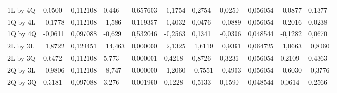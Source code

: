 \begin{table}[H]
{\begin{tabular}{lllllllllll}
\rowcolor[HTML]{FFFFFF} 
1L by 4Q       & 0,0500                          & 0,112108                        & 0,446                           & 0,657603                        & -0,1754                         & 0,2754                          & 0,0250                          & 0,056054                        & -0,0877                         & 0,1377                          \\
\rowcolor[HTML]{FFFFFF} 
1Q by 4L       & -0,1778                         & 0,112108                        & -1,586                          & 0,119357                        & -0,4032                         & 0,0476                          & -0,0889                         & 0,056054                        & -0,2016                         & 0,0238                          \\
\rowcolor[HTML]{FFFFFF} 
1Q by 4Q       & -0,0611                         & 0,097088                        & -0,629                          & 0,532046                        & -0,2563                         & 0,1341                          & -0,0306                         & 0,048544                        & -0,1282                         & 0,0670                          \\
\rowcolor[HTML]{FFFFFF} 
2L by 3L       & {\color[HTML]{FF0000} -1,8722}  & {\color[HTML]{FF0000} 0,129451} & {\color[HTML]{FF0000} -14,463}  & {\color[HTML]{FF0000} 0,000000} & {\color[HTML]{FF0000} -2,1325}  & {\color[HTML]{FF0000} -1,6119}  & {\color[HTML]{FF0000} -0,9361}  & {\color[HTML]{FF0000} 0,064725} & {\color[HTML]{FF0000} -1,0663}  & {\color[HTML]{FF0000} -0,8060}  \\
\rowcolor[HTML]{FFFFFF} 
2L by 3Q       & {\color[HTML]{FF0000} 0,6472}   & {\color[HTML]{FF0000} 0,112108} & {\color[HTML]{FF0000} 5,773}    & {\color[HTML]{FF0000} 0,000001} & {\color[HTML]{FF0000} 0,4218}   & {\color[HTML]{FF0000} 0,8726}   & {\color[HTML]{FF0000} 0,3236}   & {\color[HTML]{FF0000} 0,056054} & {\color[HTML]{FF0000} 0,2109}   & {\color[HTML]{FF0000} 0,4363}   \\
\rowcolor[HTML]{FFFFFF} 
2Q by 3L       & {\color[HTML]{FF0000} -0,9806}  & {\color[HTML]{FF0000} 0,112108} & {\color[HTML]{FF0000} -8,747}   & {\color[HTML]{FF0000} 0,000000} & {\color[HTML]{FF0000} -1,2060}  & {\color[HTML]{FF0000} -0,7551}  & {\color[HTML]{FF0000} -0,4903}  & {\color[HTML]{FF0000} 0,056054} & {\color[HTML]{FF0000} -0,6030}  & {\color[HTML]{FF0000} -0,3776}  \\
\rowcolor[HTML]{FFFFFF} 
2Q by 3Q       & {\color[HTML]{FF0000} 0,3181}   & {\color[HTML]{FF0000} 0,097088} & {\color[HTML]{FF0000} 3,276}    & {\color[HTML]{FF0000} 0,001960} & {\color[HTML]{FF0000} 0,1228}   & {\color[HTML]{FF0000} 0,5133}   & {\color[HTML]{FF0000} 0,1590}   & {\color[HTML]{FF0000} 0,048544} & {\color[HTML]{FF0000} 0,0614}   & {\color[HTML]{FF0000} 0,2566}   \\

\end{tabular}}
\end{table}
